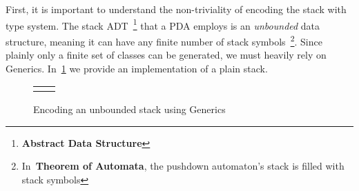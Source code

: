 First, it is important to understand the non-triviality of encoding the stack with \Java type system.
  The stack ADT~\footnote{\textbf{Abstract Data Structure}} that a PDA employs is an \emph{unbounded} data structure,
  meaning it can have any finite number of stack symbols~\footnote{In~\textbf{Theorem of Automata}, the pushdown automaton's stack is filled with stack symbols}.
Since plainly only a finite set of \Java classes can be generated, we must heavily rely on \Java Generics.
In~\cref{Figure:stack:encoding} we provide an implementation of a plain stack.
\begin{figure}[htb]
    \caption{\label{Figure:stack:encoding}
    Encoding an unbounded stack using \Java Generics}    
    \begin{tabular}{cc}
      \hspace{-3ex}\parbox[c]{0.295\linewidth}{
	
      }
      &
      \parbox[c]{0.74\linewidth}{
      }
      \\
      (a) type hierarchy & \hspace{-3ex}(b) implementation
    \end{tabular}
\end{figure}

